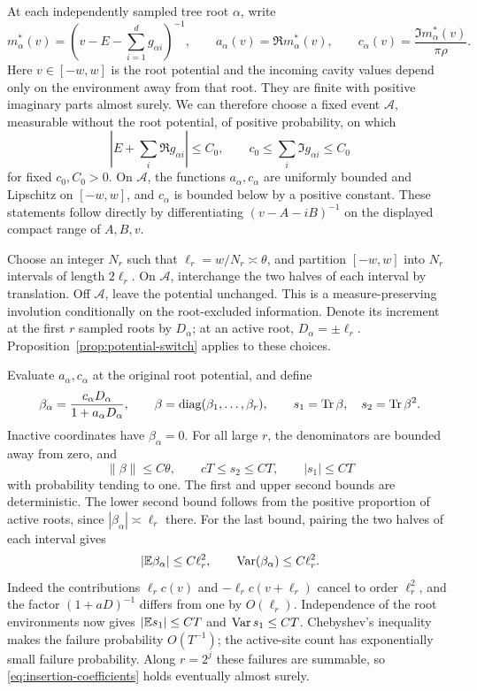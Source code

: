 At each independently sampled tree root \(\alpha\), write
\[
 m_\alpha^*(v)=(v-E-\textstyle\sum_{i=1}^d g_{\alpha i})^{-1},\qquad
 a_\alpha(v)=\Re m_\alpha^*(v),\qquad
 c_\alpha(v)=\frac{\Im m_\alpha^*(v)}{\pi\rho}.
\]
Here \(v\in[-w,w]\) is the root potential and the incoming cavity
values depend only on the environment away from that root. They are finite
with positive imaginary parts almost surely. We can therefore choose a
fixed event \(\mathcal A\), measurable without the root potential, of
positive probability, on which
\[
 |E+\textstyle\sum_i\Re g_{\alpha i}|\le C_0,\qquad
 c_0\le\textstyle\sum_i\Im g_{\alpha i}\le C_0
\]
for fixed \(c_0,C_0>0\). On \(\mathcal A\), the functions \(a_\alpha,c_\alpha\)
are uniformly bounded and Lipschitz on \([-w,w]\), and
\(c_\alpha\) is bounded below by a positive constant. These statements
follow directly by differentiating \((v-A-iB)^{-1}\) on the displayed
compact range of \(A,B,v\).

Choose an integer \(N_r\) such that \(\ell_r=w/N_r\asymp\theta\), and
partition \([-w,w]\) into \(N_r\) intervals of length \(2\ell_r\).
On \(\mathcal A\), interchange the two halves of each interval by
translation. Off \(\mathcal A\), leave the potential unchanged. This is a
measure-preserving involution conditionally on the root-excluded
information. Denote its increment at the first \(r\) sampled roots by
\(D_\alpha\); at an active root, \(D_\alpha=\pm\ell_r\).
Proposition~\ref{prop:potential-switch} applies to these choices.

Evaluate \(a_\alpha,c_\alpha\) at the original root potential, and define
\begin{equation}\label{eq:sw-coefficient-bounds}
 \beta_\alpha=\frac{c_\alpha D_\alpha}{1+a_\alpha D_\alpha},\qquad
 \beta=\operatorname{diag}(\beta_1,\ldots,\beta_r),\qquad
 s_1=\operatorname{Tr}\beta,\quad s_2=\operatorname{Tr}\beta^2.
\end{equation}
Inactive coordinates have \(\beta_\alpha=0\). For all large \(r\), the
denominators are bounded away from zero, and
\begin{equation}\label{eq:insertion-coefficients}
 \|\beta\|\le C\theta,\qquad
 cT\le s_2\le CT,\qquad |s_1|\le CT
\end{equation}
with probability tending to one. The first and upper second bounds are
deterministic. The lower second bound follows from the positive proportion
of active roots, since \(|\beta_\alpha|\asymp\ell_r\) there.
For the last bound, pairing the two halves of each interval gives
\[
 |\mathbb E\beta_\alpha|\le C\ell_r^2,
 \qquad \operatorname{Var}(\beta_\alpha)\le C\ell_r^2.
\]
Indeed the contributions \(\ell_r c(v)\) and
\(-\ell_r c(v+\ell_r)\) cancel to order \(\ell_r^2\), and the
factor \((1+aD)^{-1}\) differs from one by \(O(\ell_r)\).
Independence of the root environments now gives
\(|\mathbb E s_1|\le CT\) and \(\operatorname{Var} s_1\le CT\).
Chebyshev's inequality makes the failure probability \(O(T^{-1})\);
the active-site count has exponentially small failure probability.
Along \(r=2^j\) these failures are summable, so
\eqref{eq:insertion-coefficients} holds eventually almost surely.

